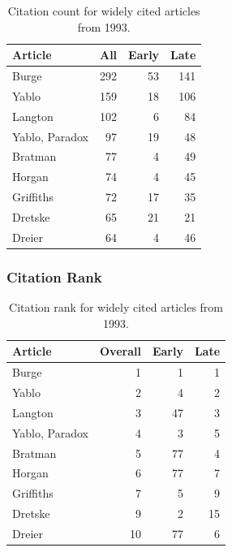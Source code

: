 \documentclass[
  10pt,
  letterpaper,
  DIV=11,
  numbers=noendperiod,
  twoside]{scrartcl}
\begin{document}
\begin{longtable}[]{@{}lrrr@{}}

\caption{\label{tbl-citation-count-1993}Citation count for widely cited
articles from 1993.}

\tabularnewline

\toprule\noalign{}
Article & All & Early & Late \\
\midrule\noalign{}
\endhead
\bottomrule\noalign{}
\endlastfoot
Burge & 292 & 53 & 141 \\
Yablo & 159 & 18 & 106 \\
Langton & 102 & 6 & 84 \\
Yablo, Paradox & 97 & 19 & 48 \\
Bratman & 77 & 4 & 49 \\
Horgan & 74 & 4 & 45 \\
Griffiths & 72 & 17 & 35 \\
Dretske & 65 & 21 & 21 \\
Dreier & 64 & 4 & 46 \\

\end{longtable}

\subsubsection*{Citation Rank}\label{sec-rank-1993}

\begin{longtable}[]{@{}lrrr@{}}

\caption{\label{tbl-citation-rank-1993}Citation rank for widely cited
articles from 1993.}

\tabularnewline

\toprule\noalign{}
Article & Overall & Early & Late \\
\midrule\noalign{}
\endhead
\bottomrule\noalign{}
\endlastfoot
Burge & 1 & 1 & 1 \\
Yablo & 2 & 4 & 2 \\
Langton & 3 & 47 & 3 \\
Yablo, Paradox & 4 & 3 & 5 \\
Bratman & 5 & 77 & 4 \\
Horgan & 6 & 77 & 7 \\
Griffiths & 7 & 5 & 9 \\
Dretske & 9 & 2 & 15 \\
Dreier & 10 & 77 & 6 \\

\end{longtable}
\end{document}

